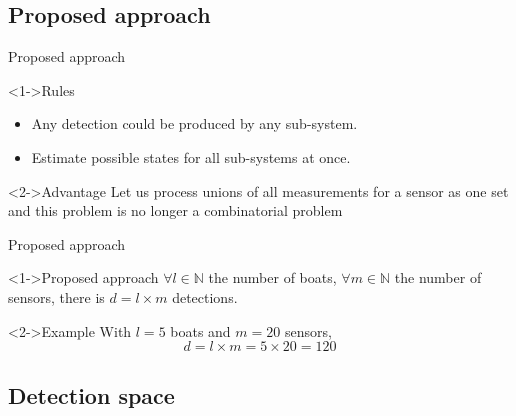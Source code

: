 \documentclass{beamer}
\begin{document}
        \subsection{Proposed approach}
            \begin{frame}{Proposed approach}
                \begin{block}<1->{\alert{Rules}}
                    \begin{itemize}
                        \item Any detection could be produced by any sub-system.
                        \item Estimate possible states for all sub-systems at once.
                    \end{itemize}
                \end{block}
                \begin{block}<2->{Advantage}
                    Let us process unions of all measurements for a sensor as one set and this problem is no longer a combinatorial problem
                \end{block}
            \end{frame}

            \begin{frame}{Proposed approach}
                \begin{block}<1->{Proposed approach}
                    $\forall l \in \mathbb{N}$ the number of boats, $\forall m \in \mathbb{N}$ the number of sensors, there is $d = l \times m$ detections.
                \end{block}
                \begin{exampleblock}<2->{Example}
                    With $l = 5$ boats and $m = 20$ sensors,
                    $$d = l \times m = 5 \times 20 = 120$$
                \end{exampleblock}
            \end{frame}

        \subsection{Detection space}
\end{document}
